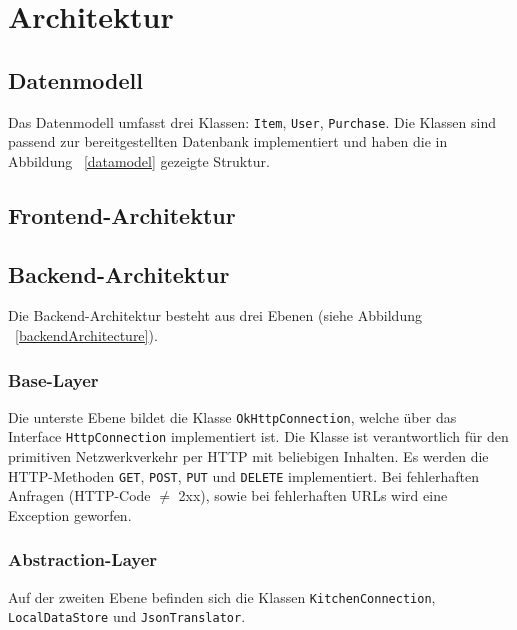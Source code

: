 \section{Architektur}\label{sec:architecture}

\subsection{Datenmodell}\label{subsec:datamodel}

Das Datenmodell umfasst drei Klassen: \texttt{Item}, \texttt{User}, \texttt{Purchase}.
Die Klassen sind passend zur bereitgestellten Datenbank implementiert und haben die in Abbildung ~\ref{datamodel} gezeigte Struktur.


\subsection{Frontend-Architektur}\label{subsec:frontend}

\subsection{Backend-Architektur}\label{subsec:backend}

Die Backend-Architektur besteht aus drei Ebenen (siehe Abbildung ~\ref{backendArchitecture}).

\subsubsection{Base-Layer}

Die unterste Ebene bildet die Klasse \texttt{OkHttpConnection}, welche über das Interface \texttt{HttpConnection} implementiert ist.
Die Klasse ist verantwortlich für den primitiven Netzwerkverkehr per HTTP mit beliebigen Inhalten.
Es werden die HTTP-Methoden \texttt{GET}, \texttt{POST}, \texttt{PUT} und \texttt{DELETE} implementiert.
Bei fehlerhaften Anfragen (HTTP-Code $\neq$ 2xx), sowie bei fehlerhaften URLs wird eine Exception geworfen.

\subsubsection{Abstraction-Layer}

Auf der zweiten Ebene befinden sich die Klassen \texttt{KitchenConnection}, \texttt{LocalDataStore} und \texttt{JsonTranslator}.

